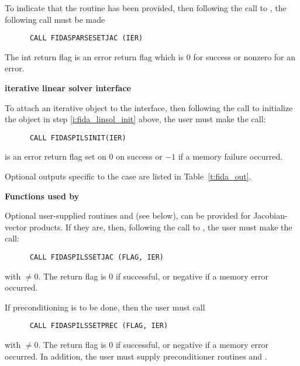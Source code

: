 \begin{Steps}
  To indicate that the  routine has been provided, then
  following the call to , the
  following call must be made    
\begin{verbatim}
      CALL FIDASPARSESETJAC (IER)
\end{verbatim}
  The int return flag  is an error return flag which is $0$
  for success or nonzero for an error.

  
  {\bf {\idaspils} iterative linear solver interface}
  
  To attach an iterative {\sunlinsol} object to the {\idaspils}
  interface, then following the call to initialize the {\sunlinsol}
  object in step \ref{i:fida_linsol_init} above, the user must make the
  call:
\begin{verbatim}
      CALL FIDASPILSINIT(IER)
\end{verbatim}
   is an error return flag set on $0$ on success or $-1$ if a memory 
  failure occurred.

  Optional outputs specific to the {\idaspils} case are listed in
  Table~\ref{t:fida_out}.
  
  {\bf Functions used by {\idaspils}}

  Optional user-supplied routines  and 
  (see below), can be provided for Jacobian-vector products.  If they
  are, then, following the call to , the user must 
  make the call:
\begin{verbatim}
      CALL FIDASPILSSETJAC (FLAG, IER)
\end{verbatim}
  with  $\neq 0$.  The return flag  is 0 if successful,
  or negative if a memory error occurred.

  If preconditioning is to be done, then the user must call
\begin{verbatim}
      CALL FIDASPILSSETPREC (FLAG, IER)
\end{verbatim}
  with  $\neq 0$.  The return flag  is 0 if successful,
  or negative if a memory error occurred.  In addition, the user must
  supply preconditioner routines  and .


\end{Steps}
